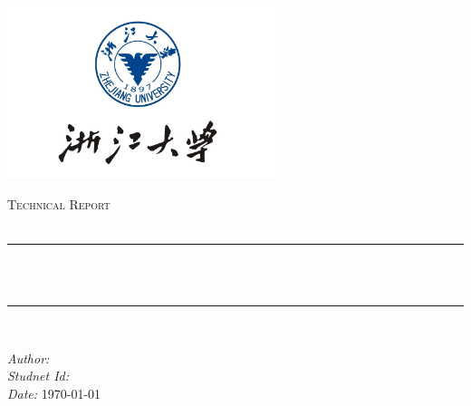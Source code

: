 \begin{titlepage}

    \newcommand{\HRule}{\rule{\linewidth}{0.5mm}} %
    
    \centering
    \includegraphics[width=8cm]{title/logo.png}\\[1cm] %
     
    
    \begin{center} %
    
    \textsc{\LARGE Technical Report}\\[2.0cm] 
    \textsc{\Large \CourseName{}}\\[0.5cm] 
    \end{center}
    \makeatletter
    \HRule \\[0.4cm]
    { \huge \bfseries \Title}\\[0.4cm] %
    \HRule \\[2.5cm]
    
    \begin{center}
    \emph{Author:} \@author\\[0.2cm] %
    \emph{Studnet Id:} \StudentId{}\\[0.2cm]
    \emph{Date:} \today\\[2cm] %
    \end{center}

    \vfill %
\end{titlepage}
